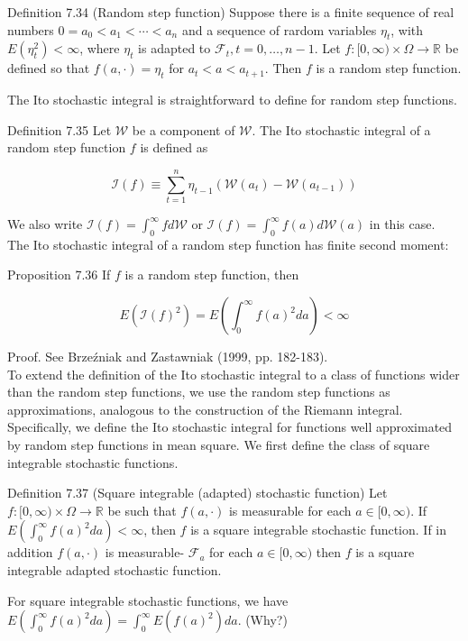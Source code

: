 \documentclass[10pt]{article}
\begin{document}
Definition 7.34 (Random step function) Suppose there is a finite sequence of real numbers $0=a_{0}<a_{1}<\cdots<a_{n}$ and a sequence of rardom variables $\eta_{t}$, with $E\left(\eta_{t}^{2}\right)<\infty$, where $\eta_{t}$ is adapted to $\mathcal{F}_{t}, t=0, \ldots, n-1$. Let $f:[0, \infty) \times \Omega \rightarrow \mathbb{R}$ be defined so that $f(a, \cdot)=\eta_{t}$ for $a_{t}<a<a_{t+1}$. Then $f$ is a random step function.

The Ito stochastic integral is straightforward to define for random step functions.

Definition 7.35 Let $\mathcal{W}$ be a component of $\mathcal{W}$. The Ito stochastic integral of a random step function $f$ is defined as

$$
\mathcal{I}(f) \equiv \sum_{t=1}^{n} \eta_{t-1}\left(\mathcal{W}\left(a_{t}\right)-\mathcal{W}\left(a_{t-1}\right)\right)
$$

We also write $\mathcal{I}(f)=\int_{0}^{\infty} f d \mathcal{W}$ or $\mathcal{I}(f)=\int_{0}^{\infty} f(a) d \mathcal{W}(a)$ in this case.\\
The Ito stochastic integral of a random step function has finite second moment:

Proposition 7.36 If $f$ is a random step function, then

$$
E\left(\mathcal{I}(f)^{2}\right)=E\left(\int_{0}^{\infty} f(a)^{2} d a\right)<\infty
$$

Proof. See Brzeźniak and Zastawniak (1999, pp. 182-183).\\
To extend the definition of the Ito stochastic integral to a class of functions wider than the random step functions, we use the random step functions as approximations, analogous to the construction of the Riemann integral. Specifically, we define the Ito stochastic integral for functions well approximated by random step functions in mean square. We first define the class of square integrable stochastic functions.

Definition 7.37 (Square integrable (adapted) stochastic function) Let $f:[0, \infty) \times \Omega \rightarrow \mathbb{R}$ be such that $f(a, \cdot)$ is measurable for each $a \in[0, \infty)$. If $E\left(\int_{0}^{\infty} f(a)^{2} d a\right)<\infty$, then $f$ is a square integrable stochastic function. If in addition $f(a, \cdot)$ is measurable- $\mathcal{F}_{a}$ for each $a \in[0, \infty)$ then $f$ is a square integrable adapted stochastic function.

For square integrable stochastic functions, we have $E\left(\int_{0}^{\infty} f(a)^{2} d a\right)= \int_{0}^{\infty} E\left(f(a)^{2}\right) d a$. (Why?)
\end{document}
